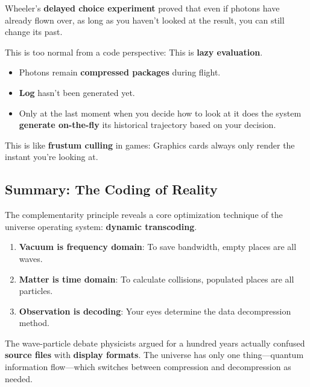 Wheeler's \textbf{delayed choice experiment} proved that even if photons have already flown over, as long as you haven't looked at the result, you can still change its past.

This is too normal from a code perspective: This is \textbf{lazy evaluation}.

\begin{itemize}
\item Photons remain \textbf{compressed packages} during flight.
\item \textbf{Log} hasn't been generated yet.
\item Only at the last moment when you decide how to look at it does the system \textbf{generate on-the-fly} its historical trajectory based on your decision.
\end{itemize}

This is like \textbf{frustum culling} in games: Graphics cards always only render the instant you're looking at.

\subsection{Summary: The Coding of Reality}

The complementarity principle reveals a core optimization technique of the universe operating system: \textbf{dynamic transcoding}.

\begin{enumerate}
\item \textbf{Vacuum is frequency domain}: To save bandwidth, empty places are all waves.
\item \textbf{Matter is time domain}: To calculate collisions, populated places are all particles.
\item \textbf{Observation is decoding}: Your eyes determine the data decompression method.
\end{enumerate}

The wave-particle debate physicists argued for a hundred years actually confused \textbf{source files} with \textbf{display formats}. The universe has only one thing---quantum information flow---which switches between compression and decompression as needed.
